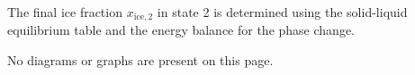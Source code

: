 The final ice fraction \( x_{\text{ice},2} \) in state 2 is determined using the solid-liquid equilibrium table and the energy balance for the phase change.  

No diagrams or graphs are present on this page.